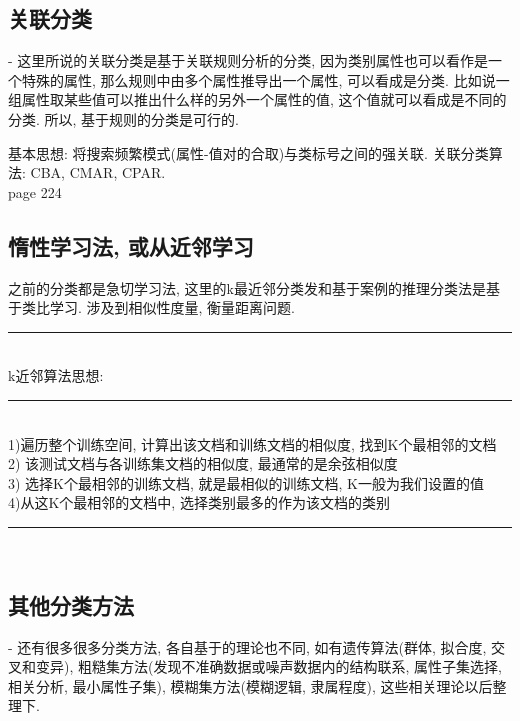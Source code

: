 \documentclass[a4paper,10pt,english]{article}
\begin{document}
\subsection{关联分类}
\begin{description}
\item{-}
\small{
这里所说的关联分类是基于关联规则分析的分类, 因为类别属性也可以看作是一个特殊的属性, 那么规则中由多个属性推导出一个属性, 可以看成是分类. 比如说一组属性取某些值可以推出什么样的另外一个属性的值, 这个值就可以看成是不同的分类. 所以, 基于规则的分类是可行的.
}
\end{description}
基本思想: 将搜索频繁模式(属性-值对的合取)与类标号之间的强关联. 关联分类算法: CBA, CMAR, CPAR. \\
page 224

\subsection{惰性学习法, 或从近邻学习}
之前的分类都是急切学习法, 这里的k最近邻分类发和基于案例的推理分类法是基于类比学习. 涉及到相似性度量, 衡量距离问题.\\
\rule{16cm}{1pt} \\
k近邻算法思想: \\
\rule{16cm}{1pt} \\
1)\hspace{3em}遍历整个训练空间, 计算出该文档和训练文档的相似度, 找到K个最相邻的文档 \\
2)\hspace{6em}    该测试文档与各训练集文档的相似度, 最通常的是余弦相似度 \\
3)\hspace{6em}    选择K个最相邻的训练文档, 就是最相似的训练文档, K一般为我们设置的值 \\
4)\hspace{3em}从这K个最相邻的文档中, 选择类别最多的作为该文档的类别 \\
\rule{16cm}{1pt} \\

\subsection{其他分类方法}
\begin{description}
\item{-}
\small{
还有很多很多分类方法, 各自基于的理论也不同, 如有遗传算法(群体, 拟合度, 交叉和变异), 粗糙集方法(发现不准确数据或噪声数据内的结构联系, 属性子集选择, 相关分析, 最小属性子集), 模糊集方法(模糊逻辑, 隶属程度), 这些相关理论以后整理下.
}
\end{description}
\end{document}
